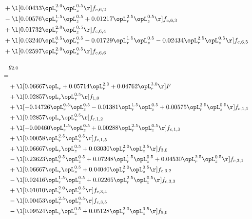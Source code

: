 \begin{alignat}{2}
& + \l[  0.00433 \opL_r^{2.0} \opL_z^{0.5}  \r] f_{c,6,2} \nonumber \\ 
& - \l[  0.00576 \opL_r^{1.5} \opL_z^{0.5} +  0.01217 \opL_r^{2.5} \opL_z^{0.5}  \r] f_{c,6,3} \nonumber \\ 
& + \l[  0.01732 \opL_r^{2.0} \opL_z^{0.5}  \r] f_{c,6,4} \nonumber \\ 
& + \l[  0.03240 \opL_r^{0.5} \opL_z^{0.5}   -0.01729 \opL_r^{1.5} \opL_z^{0.5}   -0.02434 \opL_r^{2.5} \opL_z^{0.5}  \r] f_{c,6,5} \nonumber \\ 
& + \l[  0.02597 \opL_r^{2.0} \opL_z^{0.5}  \r] f_{c,6,6} \nonumber \\ 
\end{alignat} 


\begin{alignat}{2} 
\label{eq:g_20_0} 
& g_{2,0} \nonumber \\ 
 = \\ 
& + \l[  0.06667 \opL_r +  0.05714 \opL_r^{2.0} +  0.04762 \opL_r^{3.0}  \r] F \nonumber \\ 
& + \l[  0.02857 \opL_r \opL_z^{0.5}  \r] f_{1,0} \nonumber \\ 
& + \l[  -0.14726 \opL_r^{0.5} \opL_z^{0.5}   -0.01381 \opL_r^{1.5} \opL_z^{0.5} +  0.00575 \opL_r^{2.5} \opL_z^{0.5}  \r] f_{c,1,1} \nonumber \\ 
& + \l[  0.02857 \opL_r \opL_z^{0.5}  \r] f_{c,1,2} \nonumber \\ 
& + \l[  -0.00460 \opL_r^{1.5} \opL_z^{0.5} +  0.00288 \opL_r^{2.5} \opL_z^{0.5}  \r] f_{c,1,3} \nonumber \\ 
& + \l[  0.00058 \opL_r^{2.5} \opL_z^{0.5}  \r] f_{c,1,5} \nonumber \\ 
& + \l[  0.06667 \opL_r \opL_z^{0.5} +  0.03030 \opL_r^{2.0} \opL_z^{0.5}  \r] f_{3,0} \nonumber \\ 
& - \l[  0.23623 \opL_r^{0.5} \opL_z^{0.5} +  0.07248 \opL_r^{1.5} \opL_z^{0.5} +  0.04530 \opL_r^{2.5} \opL_z^{0.5}  \r] f_{c,3,1} \nonumber \\ 
& + \l[  0.06667 \opL_r \opL_z^{0.5} +  0.04040 \opL_r^{2.0} \opL_z^{0.5}  \r] f_{c,3,2} \nonumber \\ 
& - \l[  0.02416 \opL_r^{1.5} \opL_z^{0.5} +  0.02265 \opL_r^{2.5} \opL_z^{0.5}  \r] f_{c,3,3} \nonumber \\ 
& + \l[  0.01010 \opL_r^{2.0} \opL_z^{0.5}  \r] f_{c,3,4} \nonumber \\ 
& - \l[  0.00453 \opL_r^{2.5} \opL_z^{0.5}  \r] f_{c,3,5} \nonumber \\ 
& - \l[  0.09524 \opL_r \opL_z^{0.5} +  0.05128 \opL_r^{2.0} \opL_z^{0.5}  \r] f_{5,0} \nonumber \\ 

\end{alignat}
